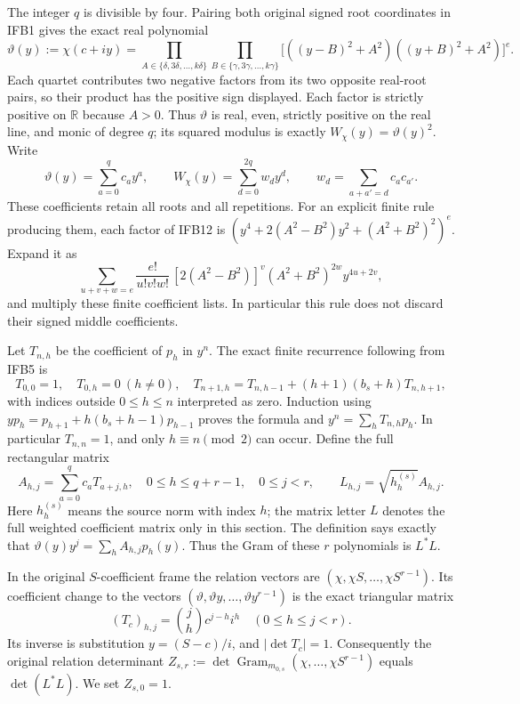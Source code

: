 \documentclass[11pt,a4paper]{article}
\begin{document}
The integer $q$ is divisible by four. Pairing both original signed
root coordinates in IFB1 gives the exact real polynomial
\[
 \vartheta(y):=\chi(c+iy)
 =\prod_{A\in\{\delta,3\delta,\ldots,k\delta\}}
   \prod_{B\in\{\gamma,3\gamma,\ldots,k\gamma\}}
 \bigl[((y-B)^2+A^2)((y+B)^2+A^2)\bigr]^e.
 \tag{IFB12}
\]
Each quartet contributes two negative factors from its two opposite
real-root pairs, so their product has the positive sign displayed.
Each factor is strictly positive on $\mathbb R$ because $A>0$.
Thus $\vartheta$ is real, even, strictly positive on the real line,
and monic of degree $q$; its squared modulus is exactly
$W_\chi(y)=\vartheta(y)^2$. Write
\[
 \vartheta(y)=\sum_{a=0}^q c_a y^a,\qquad
 W_\chi(y)=\sum_{d=0}^{2q}w_dy^d,\qquad
 w_d=\sum_{a+a'=d}c_ac_{a'}.
 \tag{IFB13}
\]
These coefficients retain all roots and all repetitions. For an
explicit finite rule producing them, each factor of IFB12 is
$(y^4+2(A^2-B^2)y^2+(A^2+B^2)^2)^e$. Expand it as
\[
 \sum_{u+v+w=e}
 \frac{e!}{u!v!w!}\,[2(A^2-B^2)]^v(A^2+B^2)^{2w}
             y^{4u+2v},
 \tag{IFB14}
\]
and multiply these finite coefficient lists. In particular this rule
does not discard their signed middle coefficients.

Let $T_{n,h}$ be the coefficient of $p_h$ in $y^n$. The exact
finite recurrence following from IFB5 is
\[
 T_{0,0}=1,\quad T_{0,h}=0\ (h\ne0),\quad
 T_{n+1,h}=T_{n,h-1}+(h+1)(b_s+h)T_{n,h+1},
 \tag{IFB15}
\]
with indices outside $0\leq h\leq n$ interpreted as zero. Induction
using $yp_h=p_{h+1}+h(b_s+h-1)p_{h-1}$ proves the formula and
$y^n=\sum_hT_{n,h}p_h$. In particular $T_{n,n}=1$, and only
$h\equiv n\pmod2$ can occur. Define the full rectangular matrix
\[
 A_{h,j}=\sum_{a=0}^q c_aT_{a+j,h},\quad
 0\leq h\leq q+r-1,\quad 0\leq j<r,
 \qquad
 L_{h,j}=\sqrt{h_h^{(s)}}A_{h,j}.
 \tag{IFB16}
\]
Here $h_h^{(s)}$ means the source norm with index $h$; the matrix
letter $L$ denotes the full weighted coefficient matrix only in this
section. The definition says exactly that
$\vartheta(y)y^j=\sum_h A_{h,j}p_h(y)$.
Thus the Gram of these $r$ polynomials is $L^*L$.

In the original $S$-coefficient frame the relation vectors are
$(\chi,\chi S,\ldots,\chi S^{r-1})$. Its coefficient change to
the vectors $(\vartheta,\vartheta y,\ldots,\vartheta y^{r-1})$
is the exact triangular matrix
\[
 (T_c)_{h,j}=\binom jh c^{j-h}i^h\quad(0\leq h\leq j<r).
 \tag{IFB17}
\]
Its inverse is substitution $y=(S-c)/i$, and
$|\det T_c|=1$. Consequently the original relation determinant
$Z_{s,r}:=\det\operatorname{Gram}_{m_{0,s}}
(\chi,\ldots,\chi S^{r-1})$ equals $\det(L^*L)$.
We set $Z_{s,0}=1$.
\end{document}
